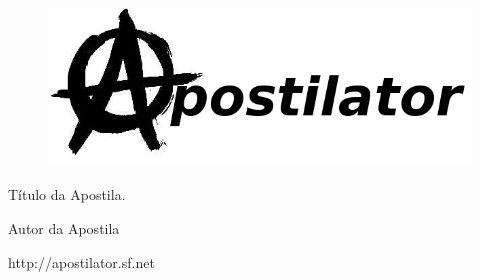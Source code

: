 \thispagestyle{empty}

\begin{center}
  \begin{figure}[H]
    \begin{center}
      \hspace{-1cm}
      \includegraphics[width=0.55\columnwidth]{titlepage.png}
    \end{center}      
  \end{figure}

  \vskip 2cm

  \hspace{-1cm}
  \begin{minipage}[c]{12cm}
    \begin{center}

{\huge \sf Título da Apostila.\vskip 0.15cm

{\small Autor da Apostila}
}
    \end{center}
  \end{minipage}

  \vskip 16cm

  {\huge http://apostilator.sf.net}

\end{center}

